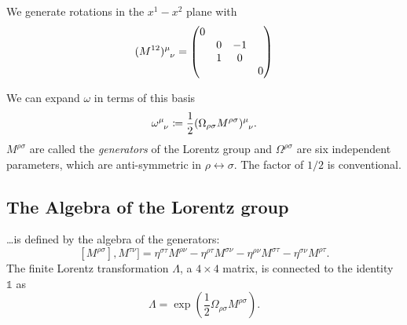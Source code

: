 \begin{example}[]
  We generate rotations in the $x^1-x^2$ plane with
  \begin{equation}
    (M^{12}) \indices{^{\mu}_{\nu}} = 
    \begin{pmatrix}
     0 &  &  &  \\
      & 0 & -1 &  \\
      & 1 & 0 &  \\
      &  &  & 0 \\
    \end{pmatrix}
  \end{equation}
\end{example}
We can expand $\omega$ in terms of this basis
\begin{equation}
  \omega \indices{^{\mu}_{\nu}} \coloneqq \frac{1}{2} (\Omega_{\rho\sigma} M^{\rho\sigma}) \indices{^{\mu}_{\nu}}.
\end{equation}
$M^{\rho\sigma}$ are called the \emph{generators} of the Lorentz group and $\Omega^{\rho\sigma}$ are six independent parameters, which are anti-symmetric in $\rho \leftrightarrow \sigma$.
The factor of $1/2$ is conventional.

\subsection{The Algebra of the Lorentz group}%
\label{sub:the_algebra_of_the_lorentz_group}

\dots is defined by the algebra of the generators:
\begin{equation}
  \label{eq:13-star}
  [M^{\rho\sigma}], M^{\tau\nu}] = \eta^{\sigma\tau} M^{\rho\nu} - \eta^{\rho\tau} M^{\sigma\nu} - \eta^{\rho\nu} M^{\sigma\tau} - \eta^{\sigma\nu} M^{\rho\tau}.
\end{equation}
The finite Lorentz transformation $\Lambda$, a $4 \times 4$ matrix, is connected to the identity $\mathbb{1}$ as
\begin{equation}
  \Lambda = \exp(\frac{1}{2} \Omega_{\rho\sigma} M^{\rho\sigma}).
\end{equation}
